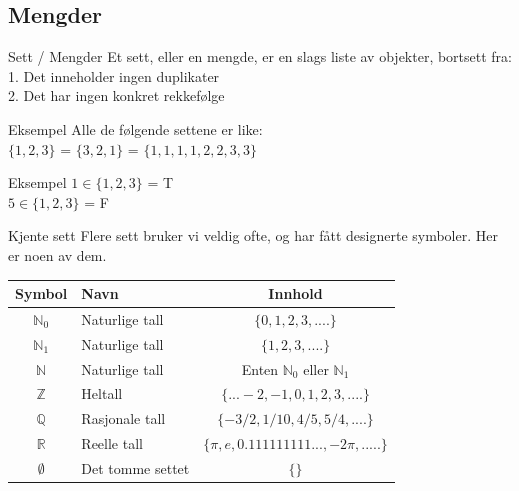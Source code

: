 \subsection{Mengder}
\begin{frame}{Sett / Mengder}
    Et sett, eller en mengde, er en slags liste av objekter, bortsett fra:\\
    \indent \hspace{3mm}    1. Det inneholder ingen duplikater\\
    \indent \hspace{3mm}    2. Det har ingen konkret rekkefølge
    
    \pause
    \begin{block}{Eksempel}
        Alle de følgende settene er like: \\
        $\{1, 2, 3\}$ = $\{3, 2, 1\}$ = $\{1, 1, 1, 1, 2, 2, 3, 3\}$
    \end{block}
    
    \pause
    \begin{block}{Eksempel}
        $1 \in \{1, 2, 3\}$ = T \\
        $5 \in \{1, 2, 3\}$ = F
    \end{block}
\end{frame}


\begin{frame}{Kjente sett}
    Flere sett bruker vi veldig ofte, og har fått designerte symboler. Her er noen av dem.\\
    
    \begin{tabular}{c|l|c}
        Symbol & Navn & Innhold \\ \hline
        $\mathbb{N}_0$ & Naturlige tall & $\{0, 1, 2, 3, ....\}$\\
        \pause
        $\mathbb{N}_1$ & Naturlige tall & $\{1, 2, 3, ....\}$\\
        \pause
        $\mathbb{N}$ & Naturlige tall & Enten $\mathbb{N}_0$ eller $\mathbb{N}_1$\\
        \pause
        $\mathbb{Z}$ & Heltall & $\{... -2, -1, 0, 1, 2, 3, ....\}$\\
        \pause
        $\mathbb{Q}$ & Rasjonale tall & $\{-3/2, 1/10, 4/5, 5/4, ....\}$\\
        \pause
        $\mathbb{R}$ & Reelle tall & $\{\pi, e, 0.111111111..., -2\pi, .....\}$\\
        \pause
        $\emptyset$ & Det tomme settet & $\{\}$
    \end{tabular}
\end{frame}

